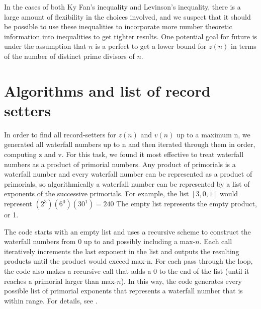 \documentclass{article}
\begin{document}
In the cases of both Ky Fan's inequality and Levinson's inequality, there is a large amount of flexibility in the choices involved, and we suspect that it should be possible to use these inequalities to incorporate more number theoretic information into inequalities to get tighter results.  One potential goal for future is under the assumption that $n$ is a perfect to get a lower bound for $z(n)$ in terms of the number of distinct prime divisors of $n$. 




\appendix

\section{Algorithms and list of record setters}

In order to find all record-setters for $z(n)$ and $v(n)$ up to a maximum n, we generated all waterfall numbers up to n and then iterated through them in order, computing z and v. For this task, we found it most effective to treat waterfall numbers as a product of primorial numbers. Any product of primorials is a waterfall number and every waterfall number can be represented as a product of primorials, so algorithmically a waterfall number can be represented by a list of exponents of the successive primorials. For example, the list $[3, 0, 1]$ would represent $(2^3)(6^0)(30^1)=240$ The empty list represents the empty product, or 1.

The code starts with an empty list and uses a recursive scheme to construct the waterfall numbers from 0 up to and possibly including a max-$n$. Each call iteratively increments the last exponent in the list and outputs the resulting products until the product would exceed max-n. For each pass through the loop, the code also makes a recursive call that adds a 0 to the end of the list (until it reaches a primorial larger than max-$n$). In this way, the code generates every possible list of primorial exponents that represents a waterfall number that is within range. For details, see  \cite{Tcode}.
\end{document}
